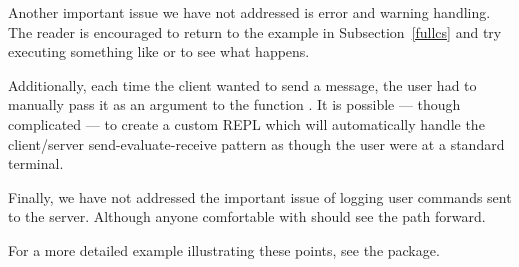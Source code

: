 Another important issue we have not addressed is error and warning handling.
The reader is encouraged to return to the example in Subsection~\ref{fullcs}
and try executing something like 
or
to see what happens.

Additionally, each time the client wanted to send a message,
the user had to manually pass it as an argument to the function 
.  It is possible --- though complicated --- to create a
custom REPL which will automatically handle the client/server 
send-evaluate-receive pattern as though the user were at a standard 
terminal.

Finally, we have not addressed the important issue of logging user commands
sent to the server.  Although anyone comfortable with  should
see the path forward.

For a more detailed example illustrating these points, see the 
package.